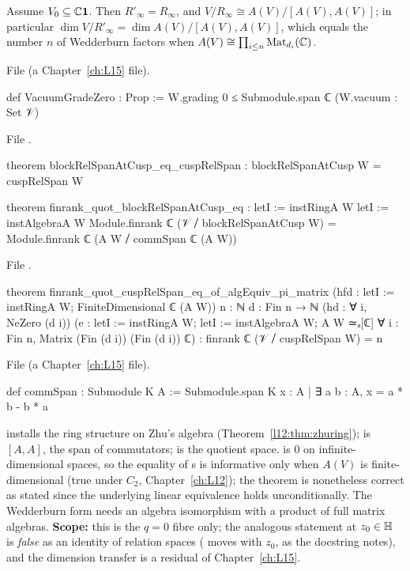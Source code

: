 \begin{theorem}\label{l14:thm:cuspfibre}
Assume $V_0\subseteq{\mathbb{C}}\mathbf 1$. Then $R'_\infty = R_\infty$, and $V/R_\infty\cong A(V)/[A(V),A(V)]$; in particular
$\dim V/R'_\infty = \dim A(V)/[A(V),A(V)]$, which equals the number $n$ of Wedderburn factors when
$A(V)\cong\prod_{i\le n}\mathrm{Mat}_{d_i}({\mathbb{C}})$.
\end{theorem}
\noindent File  (a Chapter~\ref{ch:L15} file).
\begin{leancode}
def VacuumGradeZero : Prop := W.grading 0 ≤ Submodule.span ℂ ({W.vacuum} : Set 𝒱)
\end{leancode}
\noindent File .
\begin{leancode}
theorem blockRelSpanAtCusp_eq_cuspRelSpan :
    blockRelSpanAtCusp W = cuspRelSpan W

theorem finrank_quot_blockRelSpanAtCusp_eq :
    letI := instRingA W
    letI := instAlgebraA W
    Module.finrank ℂ (𝒱 ⧸ blockRelSpanAtCusp W)
      = Module.finrank ℂ (A W ⧸ commSpan ℂ (A W))
\end{leancode}
\noindent File .
\begin{leancode}
theorem finrank_quot_cuspRelSpan_eq_of_algEquiv_pi_matrix
    (hfd : letI := instRingA W; FiniteDimensional ℂ (A W))
    {n : ℕ} {d : Fin n → ℕ} (hd : ∀ i, NeZero (d i))
    (e : letI := instRingA W; letI := instAlgebraA W;
      A W ≃ₐ[ℂ] ∀ i : Fin n, Matrix (Fin (d i)) (Fin (d i)) ℂ) :
    finrank ℂ (𝒱 ⧸ cuspRelSpan W) = n
\end{leancode}
\noindent File  (a Chapter~\ref{ch:L15} file).
\begin{leancode}
def commSpan : Submodule K A := Submodule.span K {x : A | ∃ a b : A, x = a * b - b * a}
\end{leancode}
\begin{dictionary}
 installs the ring structure on Zhu's algebra  (Theorem~\ref{l12:thm:zhuring});
 is $[A,A]$, the span of commutators;  is the quotient space.  is $0$ on
infinite-dimensional spaces, so the equality of s is informative only when $A(V)$ is finite-dimensional (true
under $C_2$, Chapter~\ref{ch:L12}); the theorem is nonetheless correct as stated since the underlying linear equivalence
 holds unconditionally. The Wedderburn form needs an algebra isomorphism
 with a product of full matrix algebras. \textbf{Scope:} this is the $q=0$ fibre only; the analogous statement at
$z_0\in\mathbb{H}$ is \emph{false} as an identity of relation spaces ( moves with $z_0$, as the
docstring notes), and the dimension transfer is a residual of Chapter~\ref{ch:L15}.
\end{dictionary}
